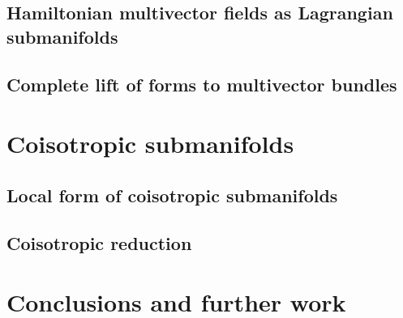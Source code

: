 \documentclass[12pt]{article}
\theoremstyle{definition}
\begin{document}
\subsection{Hamiltonian multivector fields as Lagrangian submanifolds}\label{Subsection:HamiltonianAsLagrangian}

\subsection{Complete lift of forms to multivector bundles}\label{Subsection:Completelift}


\section{Coisotropic submanifolds}\label{section:CoisotropicSubmanifolds}
\subsection{Local form of coisotropic submanifolds}\label{LocalFormSection}

\subsection{Coisotropic reduction}


\section{Conclusions and further work}\label{conclusions}


{}
\printbibliography
\end{document}
